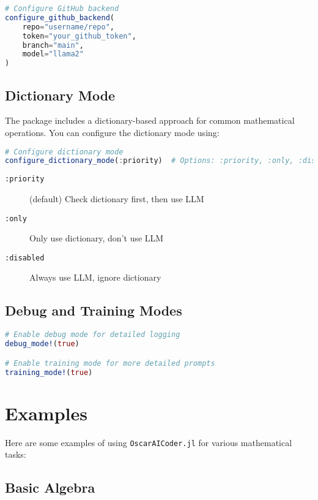 \documentclass[11pt,a4paper]{article}
\newcommand{\code}[1]{\texttt{#1}}
\newcommand{\modname}[1]{\texttt{#1}}
\providecommand{\code}[1]{\texttt{\color{blue!70!black}#1}}
\begin{document}
\begin{lstlisting}[language=Julia]
# Configure GitHub backend
configure_github_backend(
    repo="username/repo",
    token="your_github_token",
    branch="main",
    model="llama2"
)
\end{lstlisting}

\subsection{Dictionary Mode}
\label{subsec:dictionary_mode}

The package includes a dictionary-based approach for common mathematical operations. You can configure the dictionary mode using:

\begin{lstlisting}[language=Julia]
# Configure dictionary mode
configure_dictionary_mode(:priority)  # Options: :priority, :only, :disabled
\end{lstlisting}

\begin{description}
    \item[\code{:priority}] (default) Check dictionary first, then use LLM
    \item[\code{:only}] Only use dictionary, don't use LLM
    \item[\code{:disabled}] Always use LLM, ignore dictionary
\end{description}

\subsection{Debug and Training Modes}

\begin{lstlisting}[language=Julia]
# Enable debug mode for detailed logging
debug_mode!(true)

# Enable training mode for more detailed prompts
training_mode!(true)
\end{lstlisting}

\section{Examples}
\label{sec:examples}

Here are some examples of using \modname{OscarAICoder.jl} for various mathematical tasks:

\subsection{Basic Algebra}
\end{document}
